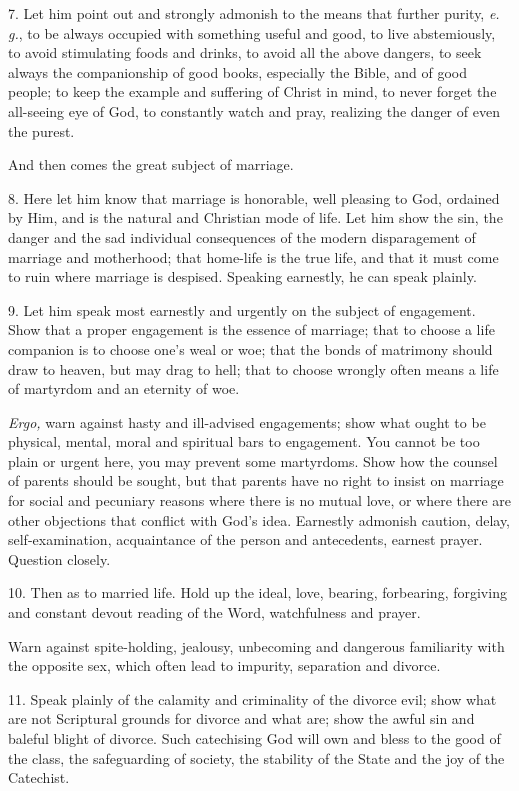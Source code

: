 7. Let him point out and strongly admonish to the means that further purity, \emph{e.\,g.}, to be always
occupied with something useful and good, to live abstemiously, to avoid stimulating foods and drinks, to avoid all the above dangers, to seek always the companionship of good books, especially the Bible, and of good people; to keep the example and suffering of Christ in mind, to never forget the all-seeing eye of God, to constantly watch and pray, realizing the danger of even the purest.

And then comes the great subject of marriage.

8. Here let him know that marriage is honorable, well pleasing to God, ordained by Him, and is the natural and Christian mode of life.  Let him show the sin, the danger and the sad individual consequences of the modern disparagement of marriage and motherhood; that home-life is the true life, and that it must come to ruin where marriage is despised. Speaking earnestly, he can speak plainly.

 9. Let him speak most earnestly and urgently on the subject of engagement. Show that a proper engagement is the essence of marriage; that to choose a life companion is to choose one’s weal or woe; that the bonds of matrimony should draw to heaven, but may drag to hell; that to choose wrongly often means a life of martyrdom and an eternity of woe.

\emph{Ergo,} warn against hasty and ill-advised engagements; show what ought to be physical, mental, moral and spiritual bars to engagement. You cannot
be too plain or urgent here, you may prevent some martyrdoms. Show how the counsel of parents should be sought, but that parents have no right to insist on marriage for social and pecuniary reasons where there is no mutual love, or where there are other objections that conflict with God’s idea. Earnestly admonish caution, delay, self-examination, acquaintance of the person and antecedents, earnest prayer. Question closely.

 10. Then as to married life. Hold up the ideal, love, bearing, forbearing, forgiving and constant devout reading of the Word, watchfulness and prayer.

Warn against spite-holding, jealousy, unbecoming and dangerous familiarity with the opposite sex, which often lead to impurity, separation and divorce.

 11. Speak plainly of the calamity and criminality of the divorce evil; show what are not Scriptural grounds for divorce and what are; show the awful sin and baleful blight of divorce. Such catechising God will own and bless to the good of the class, the safeguarding of society, the stability of the State and the joy of the Catechist.

